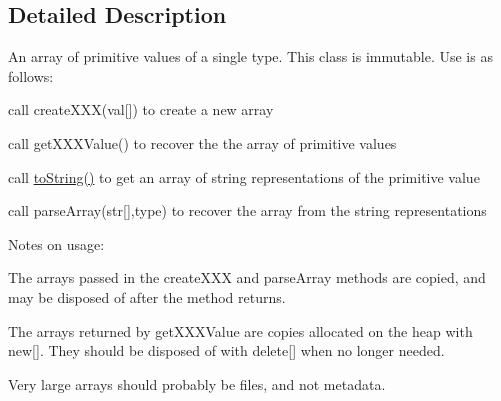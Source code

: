 

\subsection{Detailed Description}
An array of primitive values of a single type. This class is immutable. Use is as follows:
\begin{DoxyItemize}
\item call createXXX(val\mbox{[}\mbox{]}) to create a new array
\item call getXXXValue() to recover the the array of primitive values
\item call \hyperlink{classBUSBOY_1_1MetadataArray_adb7b1b79f1846ef2afbb9a5d86e9f49d}{toString()} to get an array of string representations of the primitive value
\item call parseArray(str\mbox{[}\mbox{]},type) to recover the array from the string representations
\end{DoxyItemize}Notes on usage:
\begin{DoxyItemize}
\item The arrays passed in the createXXX and parseArray methods are copied, and may be disposed of after the method returns.
\item The arrays returned by getXXXValue are copies allocated on the heap with new\mbox{[}\mbox{]}. They should be disposed of with delete\mbox{[}\mbox{]} when no longer needed.
\item Very large arrays should probably be files, and not metadata.
\end{DoxyItemize}

